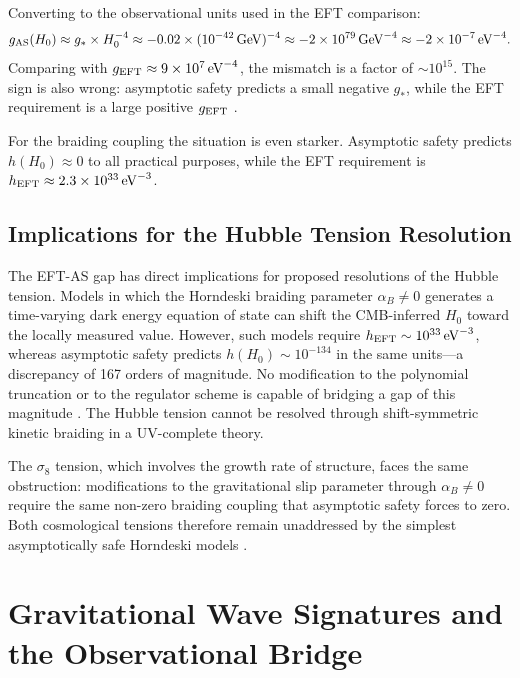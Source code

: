 \documentclass[12pt,a4paper]{article}
\begin{document}
Converting to the observational units used in the EFT comparison:
\begin{equation}
g_{\rm AS}(H_0) \approx g_* \times H_0^{-4}
\approx -0.02\times (10^{-42}\,{\rm GeV})^{-4}
\approx -2\times 10^{79}\,{\rm GeV}^{-4}
\approx -2\times 10^{-7}\,{\rm eV}^{-4}.
\end{equation}
Comparing with $g_{\rm EFT} \approx 9\times 10^7\,{\rm eV}^{-4}$, the
mismatch is a factor of $\sim 10^{15}$. The sign is also wrong: asymptotic
safety predicts a small negative $g_*$, while the EFT requirement is a large
positive $g_{\rm EFT}$ \cite{EichhornLinoWagner2023}.

For the braiding coupling the situation is even starker. Asymptotic safety
predicts $h(H_0) \approx 0$ to all practical purposes, while the EFT
requirement is $h_{\rm EFT} \approx 2.3\times 10^{33}\,{\rm eV}^{-3}$.

\subsection{Implications for the Hubble Tension Resolution}

The EFT-AS gap has direct implications for proposed resolutions of the Hubble
tension. Models in which the Horndeski braiding parameter $\alpha_B \neq 0$
generates a time-varying dark energy equation of state can shift the CMB-inferred
$H_0$ toward the locally measured value. However, such models require
$h_{\rm EFT} \sim 10^{33}\,{\rm eV}^{-3}$, whereas asymptotic safety predicts
$h(H_0) \sim 10^{-134}$ in the same units---a discrepancy of 167 orders of
magnitude. No modification to the polynomial truncation or to the regulator
scheme is capable of bridging a gap of this magnitude
\cite{EichhornLinoWagner2023,EichhornHebeckerPawlowskiWalcher2024}. The
Hubble tension cannot be resolved through shift-symmetric kinetic braiding
in a UV-complete theory.

The $\sigma_8$ tension, which involves the growth rate of structure, faces the
same obstruction: modifications to the gravitational slip parameter through
$\alpha_B \neq 0$ require the same non-zero braiding coupling that asymptotic
safety forces to zero. Both cosmological tensions therefore remain unaddressed
by the simplest asymptotically safe Horndeski models \cite{Planck2018,Riess2019}.

\section{Gravitational Wave Signatures and the Observational Bridge}
\label{sec:gw_signatures}
\end{document}
